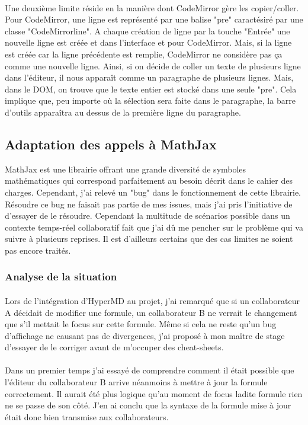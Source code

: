\documentclass[12pt]{article}
\begin{document}
\paragraph{}
Une deuxième limite réside en la manière dont CodeMirror gère les copier/coller. Pour CodeMirror, une ligne est représenté par une balise "pre" caractésiré par une classe "CodeMirrorline". A chaque création de ligne par la touche "Entrée" une nouvelle ligne est créée et dans l'interface et pour CodeMirror. Mais, si la ligne est créée car la ligne précédente est remplie, CodeMirror ne considère pas ça comme une nouvelle ligne. Ainsi, si on décide de coller un texte de plusieurs ligne dans l'éditeur, il nous apparaît comme un paragraphe de plusieurs lignes. Mais, dans le DOM, on trouve que le texte entier est stocké dans une seule "pre". Cela implique que, peu importe où la sélection sera faite dans le paragraphe, la barre d'outils apparaîtra au dessus de la première ligne du paragraphe.

\newpage
\subsection{Adaptation des appels à MathJax}
MathJax est une librairie offrant une grande diversité de symboles mathématiques qui correspond parfaitement au besoin décrit dans le cahier des charges. Cependant, j'ai relevé un "bug" dans le fonctionnement de cette librairie. Résoudre ce bug ne faisait pas partie de mes issues, mais j'ai pris l'initiative de d'essayer de le résoudre. Cependant la multitude de scénarios possible dans un contexte temps-réel collaboratif fait que j'ai dû me pencher sur le problème qui va suivre à plusieurs reprises. Il est d'ailleurs certains que des cas limites ne soient pas encore traités.

\subsubsection{Analyse de la situation}
\paragraph{}
Lors de l'intégration d'HyperMD au projet, j'ai remarqué que si un collaborateur A décidait de modifier une formule, un collaborateur B ne verrait le changement que s'il mettait le focus sur cette formule. Même si cela ne reste qu'un bug d'affichage ne causant pas de divergences, j'ai proposé à mon maître de stage d'essayer de le corriger avant de m'occuper des cheat-sheets.
\paragraph{}
Dans un premier temps j'ai essayé de comprendre comment il était possible que l'éditeur du collaborateur B arrive néanmoins à mettre à jour la formule correctement. Il aurait été plus logique qu'au moment de focus ladite formule rien ne se passe de son côté. J'en ai conclu que la syntaxe de la formule mise à jour était donc bien transmise aux collaborateurs.
\end{document}
